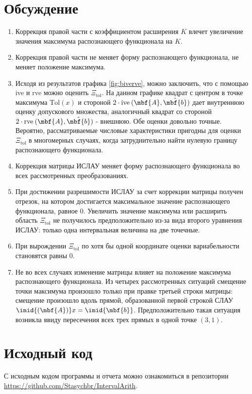 \documentclass[a4paper]{article}
\begin{document}
\section{Обсуждение}
\begin{enumerate}
    \item Коррекция правой части с коэффициентом расширения $K$ влечет увеличение значения максимума распознающего функционала на $K$.
    \item Коррекция правой части не меняет форму распознающего функционала, не меняет положение максимума.
    \item Исходя из результатов графика \ref{fig:biverve}, можно заключить, что с помощью $\mathrm{ive}$ и $\mathrm{rve}$ можно оценить $\Xi_{\mathrm{tol}}$. На данном графике квадрат с центром в точке максимума $\mathrm{Tol}(x)$ и стороной $2\cdot\mathrm{ive}\:(\mbf{A}, \hat{\mbf{b}})$ дает внутреннюю оценку допускового множества, аналогичный квадрат со стороной $2\cdot\mathrm{rve}\:(\mbf{A}, \hat{\mbf{b}})$ - внешнюю. Обе оценки довольно точные. Вероятно, рассматриваемые числовые характеристики пригодны для оценки $\Xi_{\mathrm{tol}}$ в многомерных случаях, когда затруднительно найти нулевую границу распознающего функционала.
    \item Коррекция матрицы ИСЛАУ меняет форму распознающего функционала во всех рассмотренных преобразованиях. 
    \item При достижении разрешимости ИСЛАУ за счет коррекции матрицы получен отрезок, на котором достигается максимальное значение распознающего функционала, равное 0. Увеличить значение максимума или расширить область $\Xi_{\mathrm{tol}}$ не получилось предположительно из-за вида второго уравнения ИСЛАУ: только одна интервальная величина на две точечные.
    \item При вырождении $\Xi_{\mathrm{tol}}$ по хотя бы одной координате оценки вариабельности становятся равны 0.
    \item Не во всех случаях изменение матрицы влияет на положение максимума распознающего функционала. Из четырех рассмотренных ситуаций смещение точки максимума произошло только при правке третьей строки матрицы: смещение произошло вдоль прямой, образованной первой строкой СЛАУ $\imid{(\mbf{A})}x=\imid{\mbf{b}}$. Предположительно такая ситуация возникла ввиду пересечения всех трех прямых в одной точке $(3,1)$.
\end{enumerate}
\section*{Исходный код}
С исходным кодом программы и отчета можно ознакомиться в репозитории \url{https://github.com/Stasychbr/IntervalArith}.
\end{document}
